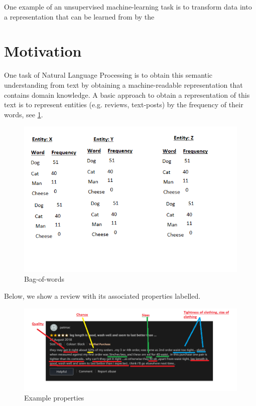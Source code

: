 One example of an unsupervised machine-learning task is to transform data into a representation that can be learned from by the 

\section{Motivation}



One task of Natural Language Processing is to obtain this semantic understanding from text by obtaining a machine-readable representation that contains domain knowledge. A basic approach to obtain a representation of this text is to represent entities (e.g. reviews, text-posts) by the frequency of their words, see \ref{Bag-of-words-example}.

\begin{figure}[t]
	\includegraphics[width=\textwidth]{images/bowbowbow.png}
	\centering
	\caption{Bag-of-words  }\label{Bag-of-words-example}
\end{figure}


 Below, we show a review with its associated properties labelled.

\begin{figure}[t]
	\includegraphics[width=\textwidth]{images/leg_length.png}
	\centering
	\caption{Example properties  }\label{IntroDecisionTree}
\end{figure}

